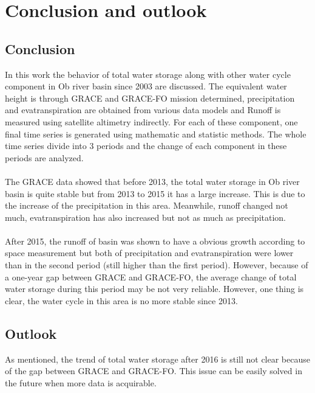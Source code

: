 \chapter{Conclusion and outlook}
\section{Conclusion}
In this work the behavior of total water storage along with other water cycle component in Ob river basin since 2003 are discussed. The equivalent water height is through GRACE and GRACE-FO mission determined, precipitation and evatranspiration are obtained from various data models and Runoff is measured using satellite altimetry indirectly. For each of these component, one final time series is generated using mathematic and statistic methods. The whole time series divide into 3 periods and the change of each component in these periods are analyzed. \\\\
The GRACE data showed that before 2013, the total water storage in Ob river basin is quite stable but from 2013 to 2015 it has a large increase. This is due to the increase of the precipitation in this area. Meanwhile, runoff changed not much, evatranspiration has also increased but not as much as precipitation.\\\\
After 2015, the runoff of basin was shown to have a obvious growth according to space measurement but both of precipitation and evatranspiration were lower than in the second period (still higher than the first period). However, because of a one-year gap between GRACE and GRACE-FO, the average change of total water storage during this period may be not very reliable. However, one thing is clear, the water cycle in this area is no more stable since 2013.
\section{Outlook}
As mentioned, the trend of total water storage after 2016 is still not clear because of the gap between GRACE and GRACE-FO. This issue can be easily solved in the future when more data is acquirable. 